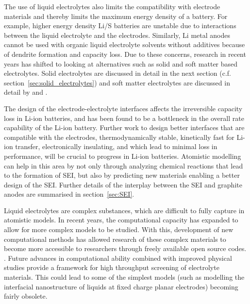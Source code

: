 \documentclass[../main.tex]{subfiles}
\begin{document}
\begin{itemize}
    The use of liquid electrolytes also limits the compatibility with electrode materials and thereby limits the maximum energy density of a battery.\cite{Liu2019_e_den} For example, higher energy density Li/S batteries are unstable due to interactions between the liquid electrolyte and the electrodes.\cite{Zhang2013_PS} Similarly, Li metal anodes cannot be used with organic liquid electrolyte solvents without additives\cite{Wu2019_Li_electrolyte} because of dendrite formation and capacity loss.\cite{Kushima2017, Lin2019_li_corrosion} Due to these concerns, research in recent years has shifted to looking at alternatives such as solid and soft matter based electrolytes.\cite{Zhang2018se_review} Solid electrolytes are discussed in detail in the next section (c.f. section~\ref{sec:solid_electrolytes}) and soft matter electrolytes are discussed in detail by \citeauthor{Hallinan_2013} and \citeauthor{popovic2011chemistry}. \cite{Hallinan_2013,popovic2011chemistry}
\end{itemize}
    
The design of the electrode-electrolyte interfaces affects the irreversible capacity loss in Li-ion batteries, and has been found to be a bottleneck in the overall rate capability of the Li-ion battery.\cite{Xu2011,Xu2014} Further work to design better interfaces that are compatible with the electrodes, thermodynamically stable, kinetically fast for Li-ion transfer, electronically insulating, and which lead to minimal loss in performance, will be crucial to progress in Li-ion batteries.\cite{Xu2004, Goodenough2010, Yu2017} Atomistic modelling can help in this area by not only through analyzing chemical reactions that lead to the formation of SEI, but also by predicting new materials enabling a better design of the SEI.\cite{Wang2018} Further details of the interplay between the SEI and graphite anodes are summarised in section~\ref{sec:SEI}.
    
Liquid electrolytes are complex substances, which are difficult to fully capture in atomistic models. In recent years, the computational capacity has expanded to allow for more complex models to be studied. With this, development of new computational methods has allowed research of these complex materials to become more accessible to researchers through freely available open source codes. \cite{merlet_highly_2013, borodin_interfacial_2014, Simoncelli_2018,marin-lafleche_metalwalls_2020}. Future advances in computational ability combined with improved physical studies provide a framework for high throughput screening of electrolyte materials. This could lead to some of the simplest models (such as modelling the interfacial nanostructure of liquids at fixed charge planar electrodes\cite{merlet_simulating_2013}) becoming fairly obsolete.
\end{document}
